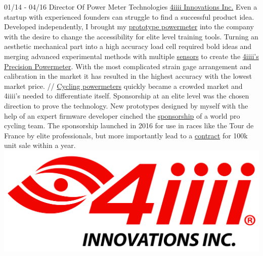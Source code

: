\documentclass[]{friggeri-cv}
\begin{document}
\begin{entrylist}
  \wentry
    {01/14 - 04/16}
    {Director Of Power Meter Technologies}
    {\href{https://www.4iiii.com}{4iiii Innovations Inc.}}
    {Even a startup with experienced founders can struggle to find a successful product idea. Developed independently, I brought my \href{http://keithhack.blogspot.com/2013/09/prelude-to-launching-beta-test.html}{prototype powermeter} into the company with the desire to change the accessibility for elite level training tools. Turning an aesthetic mechanical part into a high accuracy load cell required bold ideas and merging advanced experimental methods with multiple \href{https://en.wikipedia.org/wiki/Strain_gauge}{sensors} to create the \href{https://4iiii-innovations.myshopify.com/collections/power-meters/products/precision-pro-ride-ready}{4iiii's Precision Powermeter}. With the most complicated strain gage arrangement and calibration in the market it has resulted in the  highest accuracy with the lowest market price. //
\href{https://en.wikipedia.org/wiki/Cycling_power_meter}{Cycling powermeters} quickly became a crowded market and 4iiii's needed to differentiate itself. Sponsorship at an elite level was the chosen direction to prove the technology. New prototypes designed by myself with the help of an expert firmware developer cinched the  \href{https://4iiii.com/proteam-precision-20160107/}{sponsorship} of a world pro cycling team. The sponsorship launched in 2016 for use in races like the Tour de France by elite professionals, but more importantly lead to a \href{https://www.specialized.com/us/en/stories/power-cranks}{contract} for 100k unit sale within a year.}
	{\includegraphics[scale=0.016]{img/4iiii_large.jpg}}


\end{entrylist}
\end{document}
